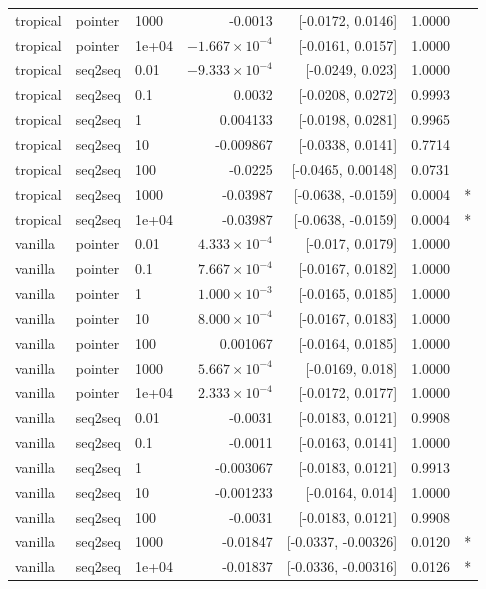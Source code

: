 \documentclass[10pt]{article}
\begin{document}
{\begin{longtable}{lllrrrl}
tropical & pointer & 1000 & -0.0013 & [-0.0172, 0.0146] & 1.0000 & \\
tropical & pointer & 1e+04 & $-1.667\times10^{-4}$ & [-0.0161, 0.0157] & 1.0000 & \\
tropical & seq2seq & 0.01 & $-9.333\times10^{-4}$ & [-0.0249, 0.023] & 1.0000 & \\
tropical & seq2seq & 0.1 & 0.0032 & [-0.0208, 0.0272] & 0.9993 & \\
tropical & seq2seq & 1 & 0.004133 & [-0.0198, 0.0281] & 0.9965 & \\
tropical & seq2seq & 10 & -0.009867 & [-0.0338, 0.0141] & 0.7714 & \\
tropical & seq2seq & 100 & -0.0225 & [-0.0465, 0.00148] & 0.0731 & \\
tropical & seq2seq & 1000 & -0.03987 & [-0.0638, -0.0159] & 0.0004 & *\\
tropical & seq2seq & 1e+04 & -0.03987 & [-0.0638, -0.0159] & 0.0004 & *\\
vanilla & pointer & 0.01 & $4.333\times10^{-4}$ & [-0.017, 0.0179] & 1.0000 & \\
vanilla & pointer & 0.1 & $7.667\times10^{-4}$ & [-0.0167, 0.0182] & 1.0000 & \\
vanilla & pointer & 1 & $1.000\times10^{-3}$ & [-0.0165, 0.0185] & 1.0000 & \\
vanilla & pointer & 10 & $8.000\times10^{-4}$ & [-0.0167, 0.0183] & 1.0000 & \\
vanilla & pointer & 100 & 0.001067 & [-0.0164, 0.0185] & 1.0000 & \\
vanilla & pointer & 1000 & $5.667\times10^{-4}$ & [-0.0169, 0.018] & 1.0000 & \\
vanilla & pointer & 1e+04 & $2.333\times10^{-4}$ & [-0.0172, 0.0177] & 1.0000 & \\
vanilla & seq2seq & 0.01 & -0.0031 & [-0.0183, 0.0121] & 0.9908 & \\
vanilla & seq2seq & 0.1 & -0.0011 & [-0.0163, 0.0141] & 1.0000 & \\
vanilla & seq2seq & 1 & -0.003067 & [-0.0183, 0.0121] & 0.9913 & \\
vanilla & seq2seq & 10 & -0.001233 & [-0.0164, 0.014] & 1.0000 & \\
vanilla & seq2seq & 100 & -0.0031 & [-0.0183, 0.0121] & 0.9908 & \\
vanilla & seq2seq & 1000 & -0.01847 & [-0.0337, -0.00326] & 0.0120 & *\\
vanilla & seq2seq & 1e+04 & -0.01837 & [-0.0336, -0.00316] & 0.0126 & *\\
\bottomrule
\end{longtable}
}
\end{document}

